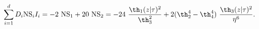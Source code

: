 \begin{equation} \label{1^6-dirac-index}
  \sum_{i=1}^d D_i {\rm NS}_i I_i = -2 ~{\rm NS}_1 +20 ~{\rm
  NS}_2 = -24 ~{\th_1(z|\tau)^2 \over \th_3^2} + 2(\th_2^4-\th_4^4)
  ~{\th_3(z|\tau)^2 \over\eta^6}.
\end{equation}

